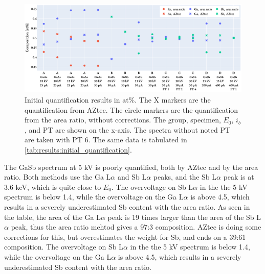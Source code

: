 



\begin{figure}[htbp]
    \centering
    \includegraphics[width=0.99\linewidth]{figures/results/initial_quantification.pdf}
    \caption{
        Initial quantification results in at\%.
        The X markers are the quantification from AZtec.
        The circle markers are the quantification from the area ratio, without corrections.
        The group, specimen, $E_0$, $i_b$, and PT are shown on the x-axis.
        The spectra without noted PT are taken with PT 6.
        The same data is tabulated in \cref{tab:results:initial_quantification}.
    }
    \label{fig:results:initial_quantification}
\end{figure}


The GaSb spectrum at 5 kV is poorly quantified, both by AZtec and by the area ratio.
Both methods use the Ga L$\alpha$ and Sb L$\alpha$ peaks, and the Sb L$\alpha$ peak is at 3.6 keV, which is quite close to $E_0$.
The overvoltage on Sb L$\alpha$ in the the 5 kV spectrum is below 1.4, while the overvoltage on the Ga L$\alpha$ is above 4.5, which results in a severely underestimated Sb content with the area ratio.
As seen in the table, the area of the Ga L$\alpha$ peak is 19 times larger than the area of the Sb L$\alpha$ peak, thus the area ratio mehtod gives a 97:3 composition.
AZtec is doing some corrections for this, but overestimates the weight for Sb, and ends on a 39:61 composition.
The overvoltage on Sb L$\alpha$ in the the 5 kV spectrum is below 1.4, while the overvoltage on the Ga L$\alpha$ is above 4.5, which results in a severely underestimated Sb content with the area ratio.


